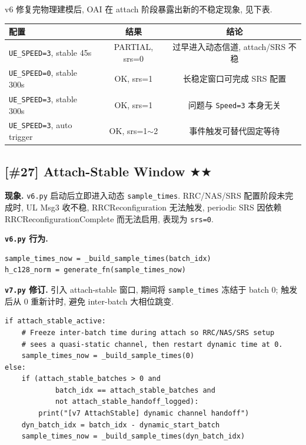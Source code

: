 \documentclass[11pt,a4paper,UTF8,fontset=fandol]{ctexart}
\newcommand{\stwo}{\textcolor{starcolor}{$\bigstar\bigstar$}}
\newcommand{\vsix}{\texttt{v6.py}}
\newcommand{\vseven}{\texttt{v7.py}}
\newcommand{\bugitem}[3]{%
  \subsection{[\##1] #2 \hfill #3}%
  \vspace{-0.5em}%
}
\begin{document}
v6 修复完物理建模后, OAI 在 attach 阶段暴露出新的不稳定现象, 见下表.

\begin{center}
\renewcommand{\arraystretch}{1.25}
\begin{tabular}{l c c}
\toprule
\textbf{配置} & \textbf{结果} & \textbf{结论} \\
\midrule
\texttt{UE\_SPEED=3}, stable 45s   & PARTIAL, srs=0   & 过早进入动态信道, attach/SRS 不稳 \\
\texttt{UE\_SPEED=0}, stable 300s  & OK, srs=1        & 长稳定窗口可完成 SRS 配置 \\
\texttt{UE\_SPEED=3}, stable 300s  & OK, srs=1        & 问题与 \texttt{Speed=3} 本身无关 \\
\texttt{UE\_SPEED=3}, auto trigger & OK, srs=1$\sim$2 & 事件触发可替代固定等待 \\
\bottomrule
\end{tabular}
\end{center}

\bugitem{27}{Attach-Stable Window}{\stwo}

\textbf{现象.} \vsix{} 启动后立即进入动态 \texttt{sample\_times}.
RRC/NAS/SRS 配置阶段未完成时, UL Msg3 收不稳, RRCReconfiguration
无法触发, periodic SRS 因依赖 RRCReconfigurationComplete 而无法启用,
表现为 \texttt{srs=0}.

\textbf{\vsix{} 行为.}
\begin{lstlisting}[caption={v6.py: lines 2119--2120 (启动即动态)}]
sample_times_now = _build_sample_times(batch_idx)
h_c128_norm = generate_fn(sample_times_now)
\end{lstlisting}

\textbf{\vseven{} 修订.} 引入 attach-stable 窗口, 期间将
\texttt{sample\_times} 冻结于 batch 0; 触发后从 0 重新计时, 避免
inter-batch 大相位跳变.
\begin{lstlisting}[caption={v7.py: lines 2186--2196}]
if attach_stable_active:
    # Freeze inter-batch time during attach so RRC/NAS/SRS setup
    # sees a quasi-static channel, then restart dynamic time at 0.
    sample_times_now = _build_sample_times(0)
else:
    if (attach_stable_batches > 0 and
            batch_idx == attach_stable_batches and
            not attach_stable_handoff_logged):
        print("[v7 AttachStable] dynamic channel handoff")
    dyn_batch_idx = batch_idx - dynamic_start_batch
    sample_times_now = _build_sample_times(dyn_batch_idx)
\end{lstlisting}
\end{document}
